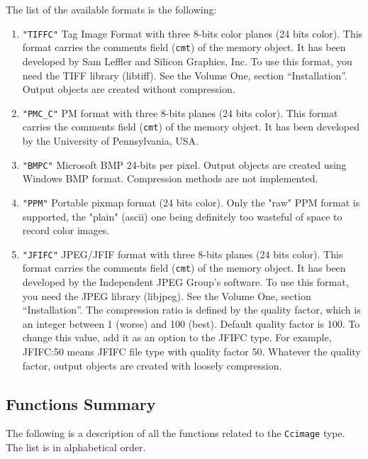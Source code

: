 The list of the available formats is the following:
\begin{enumerate}
\item \verb+"TIFFC"+  Tag Image Format with three 8-bits color planes (24 bits color).
This format carries the comments field (\verb+cmt+) of the memory object. 
It has been developed by Sam Leffler and Silicon Graphics, Inc.
To use this format, you need the TIFF library (libtiff). See the Volume One, section 
``Installation''.
Output objects are created without compression.
\item \verb+"PMC_C"+ 
PM format with three 8-bits planes (24 bits color).
This format carries the comments field (\verb+cmt+) of the memory object.
It has been developed by the University of Pennsylvania, USA.
\item \verb+"BMPC"+  Microsoft BMP 24-bits per pixel.
Output objects are created using Windows BMP format. Compression methods are not implemented.
\item \verb+"PPM"+  Portable pixmap format (24 bits color).
Only the "raw" PPM format is supported, the "plain" (ascii) one
being definitely too wasteful of space to record color images.
\item \verb+"JFIFC"+
JPEG/JFIF format with three 8-bits planes (24 bits color).
This format carries the comments field (\verb+cmt+) of the memory object.
It has been developed by the Independent JPEG Group's software.
To use this format, you need the JPEG library (libjpeg). See the Volume One, section 
``Installation''. 
The compression ratio is defined by the quality factor, which is an integer between 1 (worse) and 100 (best).
Default quality factor is 100. To change this value, add it as an option to the JFIFC type.
For example, JFIFC:50 means JFIFC file type with quality factor 50.
Whatever the quality factor, output objects are created with loosely compression.
\end{enumerate}

\subsection{Functions Summary}
\label{images_color-char-images_function}

The following is a description of all the functions related to 
the \verb+Ccimage+ type. The list is in alphabetical order.


